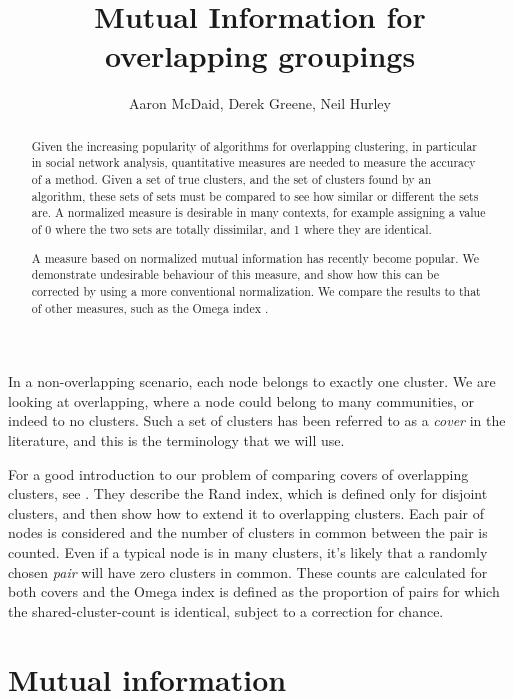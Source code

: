 \documentclass[9pt,technote]{IEEEtran}
\author{Aaron McDaid, Derek Greene, Neil Hurley}
\title{Mutual Information for overlapping groupings}
\begin{document}
\maketitle


\newcommand{\grouping}{\emph{grouping{}}}
\newcommand{\lfk}{\cite{lancichinetti-2009} {}}

\begin{abstract}
Given the increasing popularity of algorithms for overlapping clustering, in particular in social network analysis, quantitative measures are needed to measure the accuracy of a method.
Given a set of true clusters, and the set of clusters found by an algorithm, these sets of sets must be compared to see how similar or different the sets are.
A normalized measure is desirable in many contexts, for example assigning a value of 0 where the two sets are totally dissimilar, and 1 where they are identical.

A measure based on normalized mutual information has recently become popular. We demonstrate undesirable behaviour of this measure, and show how this can be corrected
by using a more conventional normalization. We compare the results to that of other measures, such as the Omega index \cite{collins1988omega}.
\end{abstract}


In a non-overlapping scenario, each node belongs to exactly one cluster. We are looking at overlapping, where a node could belong to many communities, or indeed to no clusters.
Such a set of clusters has been referred to as a \emph{cover} in the literature, and this is the terminology that we will use.

For a good introduction to our problem of comparing covers of overlapping clusters, see \cite{collins1988omega}.
They describe the Rand index, which is defined only for disjoint clusters, and then show how to extend it to overlapping clusters.
Each pair of nodes is considered and the number of clusters in common between the pair is counted. Even if a typical node is in many clusters,
it's likely that a randomly chosen \emph{pair} will have zero clusters in common.
These counts are calculated for both covers and the Omega index is defined as the proportion of pairs for which the shared-cluster-count is identical,
subject to a correction for chance.

\section{Mutual information}
\end{document}
